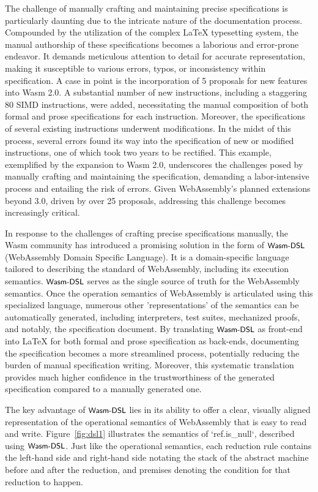 The challenge of manually crafting and maintaining precise specifications is
particularly daunting due to the intricate nature of the documentation process.
Compounded by the utilization of the complex LaTeX typesetting system, the
manual authorship of these specifications becomes a laborious and error-prone
endeavor. It demands meticulous attention to detail for accurate
representation, making it susceptible to various errors, typos, or
inconsistency within specification. A case in point is the incorporation of 5
proposals for new features into Wasm 2.0. A substantial number of new
instructions, including a staggering 80 SIMD instructions, were added,
necessitating the manual composition of both formal and prose specifications
for each instruction. Moreover, the specifications of several existing
instructions underwent modifications. In the midst of this process, several
errors found its way into the specification of new or modified instructions,
one of which took two years to be rectified. This example, exemplified by the
expansion to Wasm 2.0, underscores the challenges posed by manually crafting and
maintaining the specification, demanding a labor-intensive process and
entailing the risk of errors. Given WebAssembly's planned extensions beyond 3.0,
driven by over 25 proposals, addressing this challenge becomes increasingly
critical.

In response to the challenges of crafting precise specifications manually, the
Wasm community has introduced a promising solution in the form of $\textsf{\small Wasm-DSL}$
(WebAssembly Domain Specific Language). It is a domain-specific language
tailored to describing the standard of WebAssembly, including its execution
semantics. $\textsf{\small Wasm-DSL}$ serves as the single source of truth for the WebAssembly semantics.
Once the operation semantics of WebAssembly is articulated using this
specialized language, numerous other 'representations' of the semantics can be
automatically generated, including interpreters, test suites, mechanized
proofs, and notably, the specification document.  By translating $\textsf{\small Wasm-DSL}$ as
front-end into LaTeX for both formal and prose specification as back-ends,
documenting the specification becomes a more streamlined process, potentially
reducing the burden of manual specification writing.  Moreover, this systematic
translation provides much higher confidence in the trustworthiness of the
generated specification compared to a manually generated one.

The key advantage of $\textsf{\small Wasm-DSL}$ lies in its ability to offer a clear, visually
aligned representation of the operational semantics of WebAssembly that is easy
to read and write. Figure~\ref{fig:dsl1} illustrates the semantics of
`ref.is\_null`, described using $\textsf{\small Wasm-DSL}$. Just like the operational semantics,
each reduction rule contains the left-hand side and right-hand side notating
the stack of the abstract machine before and after the reduction, and premises
denoting the condition for that reduction to happen.

